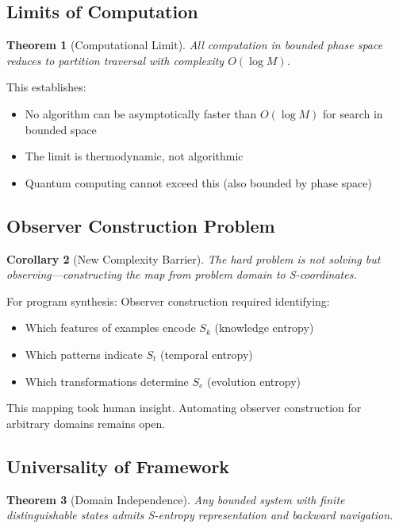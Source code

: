 \documentclass[twocolumn,10pt]{article}
\newtheorem{theorem}{Theorem}[section]
\newtheorem{corollary}[theorem]{Corollary}
\theoremstyle{definition}
\theoremstyle{remark}
\newcommand{\Sk}{S_k}
\newcommand{\St}{S_t}
\newcommand{\Se}{S_e}
\begin{document}
\subsection{Limits of Computation}

\begin{theorem}[Computational Limit]
\label{thm:comp_limit}
All computation in bounded phase space reduces to partition traversal with complexity $O(\log M)$.
\end{theorem}

This establishes:
\begin{itemize}
\item No algorithm can be asymptotically faster than $O(\log M)$ for search in bounded space
\item The limit is thermodynamic, not algorithmic
\item Quantum computing cannot exceed this (also bounded by phase space)
\end{itemize}

\subsection{Observer Construction Problem}

\begin{corollary}[New Complexity Barrier]
\label{cor:observer_barrier}
The hard problem is not solving but observing—constructing the map from problem domain to S-coordinates.
\end{corollary}

For program synthesis: Observer construction required identifying:
\begin{itemize}
\item Which features of examples encode $\Sk$ (knowledge entropy)
\item Which patterns indicate $\St$ (temporal entropy)
\item Which transformations determine $\Se$ (evolution entropy)
\end{itemize}

This mapping took human insight. Automating observer construction for arbitrary domains remains open.

\subsection{Universality of Framework}

\begin{theorem}[Domain Independence]
\label{thm:domain_indep}
Any bounded system with finite distinguishable states admits S-entropy representation and backward navigation.
\end{theorem}
\end{document}
